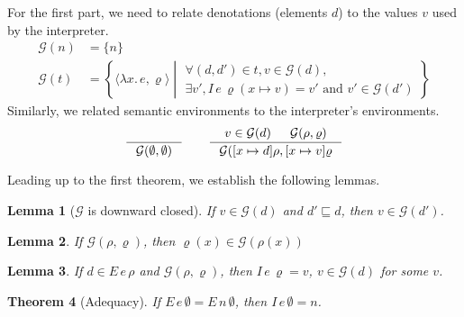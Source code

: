 \documentclass{tufte-handout}
\newcommand{\LAM}[1]{\lambda #1.\,}
\newcommand{\ext}[3]{#3(#1{\mapsto}#2)}
\newtheorem{theorem}{Theorem}%
\newtheorem{lemma}[theorem]{Lemma}
\begin{document}
For the first part, we need to relate denotations (elements $d$) to
the values $v$ used by the interpreter.
\begin{align*}
  \mathcal{G}(n) &= \{ n \} \\
  \mathcal{G}(t) &= \left\{ \langle \LAM{x} e, \varrho \rangle \middle|
     \begin{array}{l}
       \forall (d,d') \in t, v \in \mathcal{G}(d),\\
       \exists v', I\,e\,\ext{x}{v}{\varrho} = v'
               \text{ and } v'\in\mathcal{G}(d')
     \end{array} \right\}
\end{align*}
Similarly, we related semantic environments to the
interpreter's environments.
\[
  \inference{}{\mathcal{G}(\emptyset,\emptyset)}
  \qquad
  \inference{v \in \mathcal{G}(d) & \mathcal{G}(\rho,\varrho)}
            {\mathcal{G}([x\mapsto d] \rho, [x\mapsto v] \varrho}
\]

\noindent Leading up to the first theorem, we establish the following lemmas.

\begin{lemma}[$\mathcal{G}$ is downward closed]
\label{lem:sub-good}
If $v \in \mathcal{G}(d)$ and $d' \sqsubseteq d$, then $v \in \mathcal{G}(d')$.
\end{lemma}

\begin{lemma}
\label{lem:lookup-good}
  If $\mathcal{G}(\rho,\varrho)$,
  then $\varrho(x) \in \mathcal{G}(\rho(x))$
\end{lemma}

\begin{lemma}
  If $d \in E\,e\,\rho$ and $\mathcal{G}(\rho,\varrho)$, then
  $I\,e\,\varrho = v$, $v \in \mathcal{G}(d)$ for some $v$.
\end{lemma}

\begin{theorem}[Adequacy]
If $E\,e\,\emptyset = E\,n\,\emptyset$, then $I\,e\,\emptyset = n$.
\end{theorem}




\end{document}
